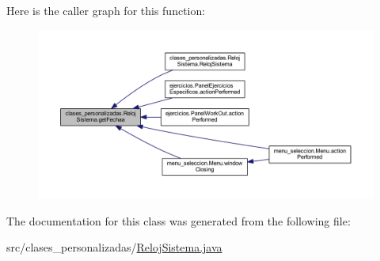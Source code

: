 Here is the caller graph for this function\+:
\nopagebreak
\begin{figure}[H]
\begin{center}
\leavevmode
\includegraphics[width=350pt]{classclases__personalizadas_1_1_reloj_sistema_a68dfd11750ec0a30be4646221c75e683_icgraph}
\end{center}
\end{figure}


The documentation for this class was generated from the following file\+:\begin{DoxyCompactItemize}
\item 
src/clases\+\_\+personalizadas/\mbox{\hyperlink{_reloj_sistema_8java}{Reloj\+Sistema.\+java}}\end{DoxyCompactItemize}
